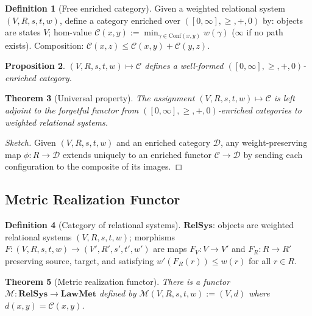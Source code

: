 \documentclass{article}
\newtheorem{theorem}{Theorem}[section]
\newtheorem{proposition}[theorem]{Proposition}
\theoremstyle{definition}
\newtheorem{definition}[theorem]{Definition}
\theoremstyle{remark}
\begin{document}
\begin{definition}[Free enriched category]
Given a weighted relational system $(V, R, s, t, w)$, define a
category enriched over $([0,\infty], \geq, +, 0)$ by: objects
are states $V$; hom-value
$\mathcal{C}(x,y) := \min_{\gamma \in \mathrm{Conf}(x,y)} w(\gamma)$
($\infty$ if no path exists). Composition:
$\mathcal{C}(x,z) \leq \mathcal{C}(x,y) + \mathcal{C}(y,z)$.
\end{definition}

\begin{proposition}
$(V, R, s, t, w) \mapsto \mathcal{C}$ defines a well-formed
$([0,\infty], \geq, +, 0)$-enriched category.
\end{proposition}

\begin{theorem}[Universal property]
\label{thm:free_enriched}
The assignment $(V, R, s, t, w) \mapsto \mathcal{C}$ is left
adjoint to the forgetful functor from
$([0,\infty], \geq, +, 0)$-enriched categories to weighted
relational systems.
\end{theorem}

\begin{proof}[Sketch]
Given $(V, R, s, t, w)$ and an enriched category $\mathcal{D}$,
any weight-preserving map $\phi : R \to \mathcal{D}$ extends
uniquely to an enriched functor $\mathcal{C} \to \mathcal{D}$
by sending each configuration to the composite of its images.
\end{proof}

\subsection{Metric Realization Functor}

\begin{definition}[Category of relational systems]
$\mathbf{RelSys}$: objects are weighted relational systems
$(V, R, s, t, w)$; morphisms $F : (V, R, s, t, w) \to
(V', R', s', t', w')$ are maps $F_V : V \to V'$ and
$F_R : R \to R'$ preserving source, target, and satisfying
$w'(F_R(r)) \leq w(r)$ for all $r \in R$.
\end{definition}

\begin{theorem}[Metric realization functor]
\label{thm:metric_functor}
There is a functor $\mathcal{M} : \mathbf{RelSys} \to
\mathbf{LawMet}$ defined by
$\mathcal{M}(V, R, s, t, w) := (V, d)$
where $d(x,y) = \mathcal{C}(x,y)$.
\end{theorem}
\end{document}

